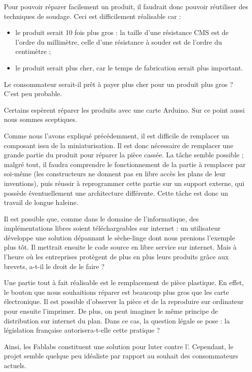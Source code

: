 Pour pouvoir  réparer facilement un produit, il faudrait donc pouvoir réutiliser des techniques de soudage. Ceci est difficilement réalisable car : 
\begin{itemize}
\item le produit serait 10 fois plus gros : la taille d'une résistance CMS est de l'ordre du millimètre, celle d'une résistance à souder est de l'ordre du centimètre ;
\item le produit serait plus cher, car le temps de fabrication serait plus important.
\end{itemize}
Le consommateur serait-il prêt à payer plus cher pour un produit plus gros ? C'est peu probable.

\medbreak
Certains espèrent réparer les produits avec une carte Arduino. Sur ce point aussi nous sommes sceptiques. 

Comme nous l'avons expliqué précédemment, il est difficile de remplacer un composant issu de la miniaturisation. Il est donc nécessaire de remplacer une grande partie du produit pour réparer la pièce cassée. La tâche semble possible ; malgré tout, il faudra comprendre le fonctionnement de la partie à remplacer par soi-même (les constructeurs ne donnent pas en libre accès les plans de leur inventions), puis réussir à reprogrammer cette partie sur un support externe, qui possède éventuellement une architecture différente. Cette tâche est donc un travail de longue haleine. 

Il est possible que, comme dans le domaine de l'informatique, des implémentations libres soient téléchargeables sur internet : un utilisateur développe une solution dépannant le sèche-linge dont nous prenions l'exemple plus tôt. Il mettrait ensuite le code source en libre service sur internet. Mais à l'heure où les entreprises protègent de plus en plus leurs produits grâce aux brevets, a-t-il le droit de le faire ? 

\medbreak
Une partie tout à fait réalisable est le remplacement de pièce plastique. En effet, le bouton que nous souhaitions réparer est beaucoup plus gros que les carte électronique. Il est possible d'observer la pièce et de la reproduire sur ordinateur pour ensuite l'imprimer. De plus, on peut imaginer le même principe de distribution sur internet du plan. Dans ce cas, la question légale se pose : la législation française autorisera-t-elle cette pratique ? 

\bigbreak
Ainsi, les Fablabs constituent une solution pour luter contre l'\op. Cependant, le projet semble quelque peu idéaliste par rapport au souhait des consommateurs actuels. 
